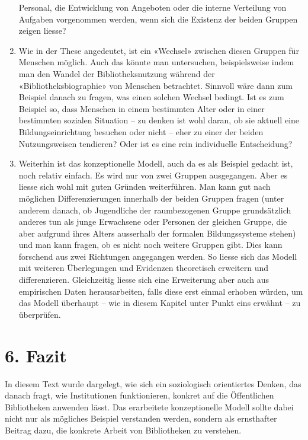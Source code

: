 \documentclass[a4paper,
fontsize=11pt,
oneside,
numbers=noperiodatend,
parskip=half-,
bibliography=totoc,
final
]{scrartcl}
\begin{document}
\begin{enumerate}
  Personal, die Entwicklung von Angeboten oder die interne Verteilung
  von Aufgaben vorgenommen werden, wenn sich die Existenz der beiden
  Gruppen zeigen liesse?
\item
  Wie in der These angedeutet, ist ein «Wechsel» zwischen diesen Gruppen
  für Menschen möglich. Auch das könnte man untersuchen, beispielsweise
  indem man den Wandel der Bibliotheksnutzung während der
  «Bibliotheksbiographie» von Menschen betrachtet. Sinnvoll wäre dann
  zum Beispiel danach zu fragen, was einen solchen Wechsel bedingt. Ist
  es zum Beispiel so, dass Menschen in einem bestimmten Alter oder in
  einer bestimmten sozialen Situation -- zu denken ist wohl daran, ob
  sie aktuell eine Bildungseinrichtung besuchen oder nicht -- eher zu
  einer der beiden Nutzungsweisen tendieren? Oder ist es eine rein
  individuelle Entscheidung?
\item
  Weiterhin ist das konzeptionelle Modell, auch da es als Beispiel
  gedacht ist, noch relativ einfach. Es wird nur von zwei Gruppen
  ausgegangen. Aber es liesse sich wohl mit guten Gründen weiterführen.
  Man kann gut nach möglichen Differenzierungen innerhalb der beiden
  Gruppen fragen (unter anderem danach, ob Jugendliche der raumbezogenen
  Gruppe grundsätzlich anderes tun als junge Erwachsene oder Personen
  der gleichen Gruppe, die aber aufgrund ihres Alters ausserhalb der
  formalen Bildungssysteme stehen) und man kann fragen, ob es nicht noch
  weitere Gruppen gibt. Dies kann forschend aus zwei Richtungen
  angegangen werden. So liesse sich das Modell mit weiteren Überlegungen
  und Evidenzen theoretisch erweitern und differenzieren. Gleichzeitig
  liesse sich eine Erweiterung aber auch aus empirischen Daten
  herausarbeiten, falls diese erst einmal erhoben würden, um das Modell
  überhaupt -- wie in diesem Kapitel unter Punkt eins erwähnt -- zu
  überprüfen.
\end{enumerate}

\hypertarget{fazit}{%
\section{6. Fazit}\label{fazit}}

In diesem Text wurde dargelegt, wie sich ein soziologisch orientiertes
Denken, das danach fragt, wie Institutionen funktionieren, konkret auf
die Öffentlichen Bibliotheken anwenden lässt. Das erarbeitete
konzeptionelle Modell sollte dabei nicht nur als mögliches Beispiel
verstanden werden, sondern als ernsthafter Beitrag dazu, die konkrete
Arbeit von Bibliotheken zu verstehen.
\end{document}
